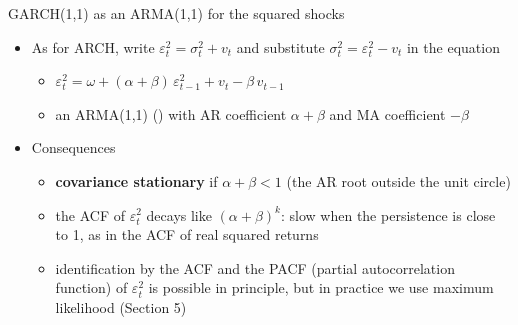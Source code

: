 \begin{frame}{GARCH(1,1) as an ARMA(1,1) for the squared shocks}
\itemsize{\small}
\begin{itemize}
    \item As for ARCH, write $\varepsilon_t^2 = \sigma_t^2 + v_t$ and substitute $\sigma_t^2 = \varepsilon_t^2 - v_t$ in the equation
    \begin{itemize}
        \item $\varepsilon_t^2 = \omega + (\alpha + \beta)\,\varepsilon_{t-1}^2 + v_t - \beta\,v_{t-1}$
        \item an ARMA(1,1) () with AR coefficient $\alpha + \beta$ and MA coefficient $-\beta$
    \end{itemize}
    \item Consequences
    \begin{itemize}
        \item \textbf{covariance stationary} if $\alpha + \beta < 1$ (the AR root outside the unit circle)
        \item the ACF of $\varepsilon_t^2$ decays like $(\alpha + \beta)^k$: slow when the persistence is close to 1, as in the ACF of real squared returns
        \item identification by the ACF and the PACF (partial autocorrelation function) of $\varepsilon_t^2$ is possible in principle, but in practice we use maximum likelihood (Section 5)
    \end{itemize}
\end{itemize}
\end{frame}

